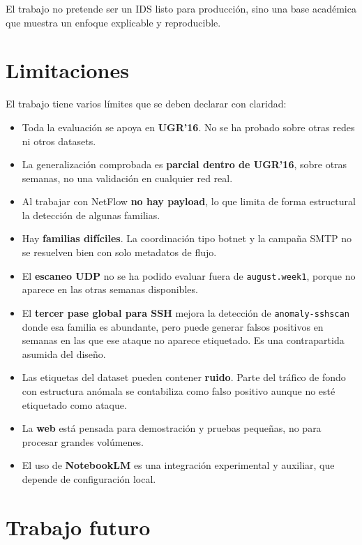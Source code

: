 El trabajo no pretende ser un IDS listo para producción, sino una base académica que muestra un enfoque explicable y reproducible.

\section{Limitaciones}
\label{sec:concl_limitaciones}

El trabajo tiene varios límites que se deben declarar con claridad:

\begin{itemize}
  \item Toda la evaluación se apoya en \textbf{UGR'16}. No se ha probado sobre otras redes ni otros datasets.
  \item La generalización comprobada es \textbf{parcial dentro de UGR'16}, sobre otras semanas, no una validación en cualquier red real.
  \item Al trabajar con NetFlow \textbf{no hay payload}, lo que limita de forma estructural la detección de algunas familias.
  \item Hay \textbf{familias difíciles}. La coordinación tipo botnet y la campaña SMTP no se resuelven bien con solo metadatos de flujo.
  \item El \textbf{escaneo UDP} no se ha podido evaluar fuera de \texttt{august.week1}, porque no aparece en las otras semanas disponibles.
  \item El \textbf{tercer pase global para SSH} mejora la detección de \texttt{anomaly-sshscan} donde esa familia es abundante, pero puede generar falsos positivos en semanas en las que ese ataque no aparece etiquetado. Es una contrapartida asumida del diseño.
  \item Las etiquetas del dataset pueden contener \textbf{ruido}. Parte del tráfico de fondo con estructura anómala se contabiliza como falso positivo aunque no esté etiquetado como ataque.
  \item La \textbf{web} está pensada para demostración y pruebas pequeñas, no para procesar grandes volúmenes.
  \item El uso de \textbf{NotebookLM} es una integración experimental y auxiliar, que depende de configuración local.
\end{itemize}

\section{Trabajo futuro}
\label{sec:concl_futuro}

